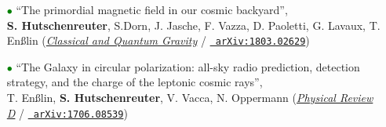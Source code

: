 \documentclass[11pt,a4paper,sans, table, dvipsnames]{moderncv}        %
\begin{document}
\begin{itemize}
\vspace{6pt}

\item[\textcolor{Green}{$\bullet$}]{``The primordial magnetic field in our cosmic backyard'', \\
\textbf{S. Hutschenreuter}, S.Dorn, J. Jasche, F. Vazza, D. Paoletti, G. Lavaux, T. En{\ss}lin (\href{https://iopscience.iop.org/article/10.1088/1361-6382/aacde0}{\color{blue}\textit{Classical and Quantum Gravity}} / \href{https://arxiv.org/abs/1803.02629}{\texttt{{\color{blue} arXiv:1803.02629}}})}

\vspace{6pt}


\vspace{6pt}

\item[\textcolor{Green}{$\bullet$}]{``The Galaxy in circular polarization: all-sky radio prediction, detection strategy, and the charge of the leptonic cosmic rays'', \\ T. En{\ss}lin,  \textbf{S. Hutschenreuter}, V. Vacca, N. Oppermann   (\href{https://journals.aps.org/prd/abstract/10.1103/PhysRevD.96.043021}{\color{blue}\textit{Physical Review D}} / \href{https://arxiv.org/abs/1706.08539}{\texttt{{\color{blue} arXiv:1706.08539}}})}
\end{itemize}

\vspace{\baselineskip}
\end{document}
